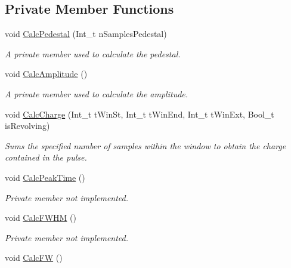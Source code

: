 \subsection*{Private Member Functions}
\begin{DoxyCompactItemize}
\item 
void \hyperlink{classPulse_a20e3e828ac32e06c115f8fcdcfeec312}{Calc\+Pedestal} (Int\+\_\+t n\+Samples\+Pedestal)
\begin{DoxyCompactList}\small\item\em A private member used to calculate the pedestal. \end{DoxyCompactList}\item 
void \hyperlink{classPulse_a78588477ccc3242861a8dceece91ca73}{Calc\+Amplitude} ()
\begin{DoxyCompactList}\small\item\em A private member used to calculate the amplitude. \end{DoxyCompactList}\item 
void \hyperlink{classPulse_af28426090374eae4d640fb68432424f4}{Calc\+Charge} (Int\+\_\+t t\+Win\+St, Int\+\_\+t t\+Win\+End, Int\+\_\+t t\+Win\+Ext, Bool\+\_\+t is\+Revolving)
\begin{DoxyCompactList}\small\item\em Sums the specified number of samples within the window to obtain the charge contained in the pulse. \end{DoxyCompactList}\item 
\mbox{\label{classPulse_ad9660f8802d0fad7d9bf37d6b9ae23d1}} 
void \hyperlink{classPulse_ad9660f8802d0fad7d9bf37d6b9ae23d1}{Calc\+Peak\+Time} ()
\begin{DoxyCompactList}\small\item\em Private member not implemented. \end{DoxyCompactList}\item 
\mbox{\label{classPulse_a2878e0ef3b6f4562bc573a814e5045bc}} 
void \hyperlink{classPulse_a2878e0ef3b6f4562bc573a814e5045bc}{Calc\+F\+W\+HM} ()
\begin{DoxyCompactList}\small\item\em Private member not implemented. \end{DoxyCompactList}\item 
\mbox{\label{classPulse_adb2f06fded260feed0fee9195e27fdf1}} 
void \hyperlink{classPulse_adb2f06fded260feed0fee9195e27fdf1}{Calc\+FW} ()

\end{DoxyCompactItemize}
